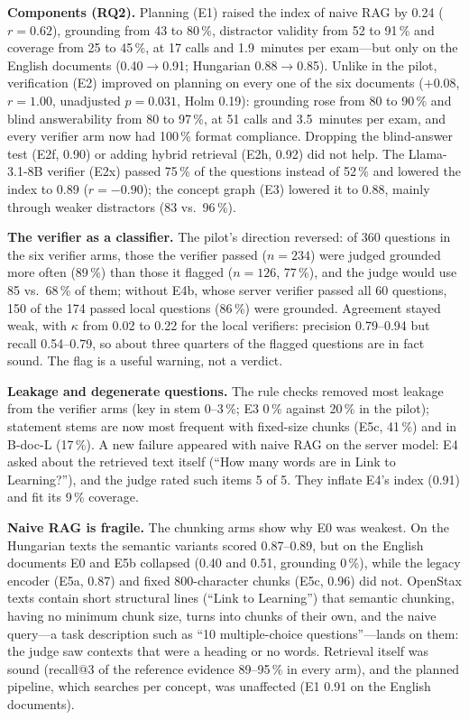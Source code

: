 \documentclass[conference]{IEEEtran}
\begin{document}
\textbf{Components (RQ2).} Planning (E1) raised the index of naive RAG by 0.24 ($r=0.62$), grounding from
43 to 80\,\%, distractor validity from 52 to 91\,\% and coverage from 25 to 45\,\%, at 17 calls and
1.9~minutes per exam---but only on the English documents (0.40$\to$0.91; Hungarian 0.88$\to$0.85). Unlike in
the pilot, verification (E2) improved on planning on every one of the six documents ($+0.08$, $r=1.00$,
unadjusted $p=0.031$, Holm 0.19): grounding rose from 80 to 90\,\% and blind answerability from 80 to
97\,\%, at 51 calls and 3.5~minutes per exam, and every verifier arm now had 100\,\% format compliance.
Dropping the blind-answer test (E2f, 0.90) or adding hybrid retrieval (E2h, 0.92) did not help. The
Llama-3.1-8B verifier (E2x) passed 75\,\% of the questions instead of 52\,\% and lowered the index to 0.89
($r=-0.90$); the concept graph (E3) lowered it to 0.88, mainly through weaker distractors (83 vs.\
96\,\%).

\textbf{The verifier as a classifier.} The pilot's direction reversed: of 360 questions in the six
verifier arms, those the verifier passed ($n=234$) were judged grounded more often (89\,\%) than those it
flagged ($n=126$, 77\,\%), and the judge would use 85 vs.\ 68\,\% of them; without E4b, whose server verifier passed all 60
questions, 150 of the 174 passed local questions (86\,\%) were grounded. Agreement stayed weak, with
$\kappa$ from 0.02 to 0.22 for the local verifiers: precision 0.79--0.94 but recall 0.54--0.79, so about
three quarters of the flagged questions are in fact sound. The flag is a useful warning, not a verdict.

\textbf{Leakage and degenerate questions.} The rule checks removed most leakage from the verifier arms
(key in stem 0--3\,\%; E3 0\,\% against 20\,\% in the pilot); statement stems are now most frequent with
fixed-size chunks (E5c, 41\,\%) and in B-doc-L (17\,\%). A new failure appeared with naive RAG on the server
model: E4 asked about the retrieved text itself (``How many words are in Link to Learning?''), and the
judge rated such items 5 of 5. They inflate E4's index (0.91) and fit its 9\,\% coverage.

\textbf{Naive RAG is fragile.} The chunking arms show why E0 was weakest. On the Hungarian texts the
semantic variants scored 0.87--0.89, but on the English documents E0 and E5b collapsed (0.40 and 0.51,
grounding 0\,\%), while the legacy encoder (E5a, 0.87) and fixed 800-character chunks (E5c, 0.96) did not.
OpenStax texts contain short structural lines (``Link to Learning'') that semantic chunking, having no
minimum chunk size, turns into chunks of their own, and the naive query---a task description such as
``10 multiple-choice questions''---lands on them: the judge saw contexts that were a heading or no words. Retrieval itself was sound (recall@3 of the
reference evidence 89--95\,\% in every arm), and the planned pipeline, which searches per concept, was
unaffected (E1 0.91 on the English documents).
\end{document}

